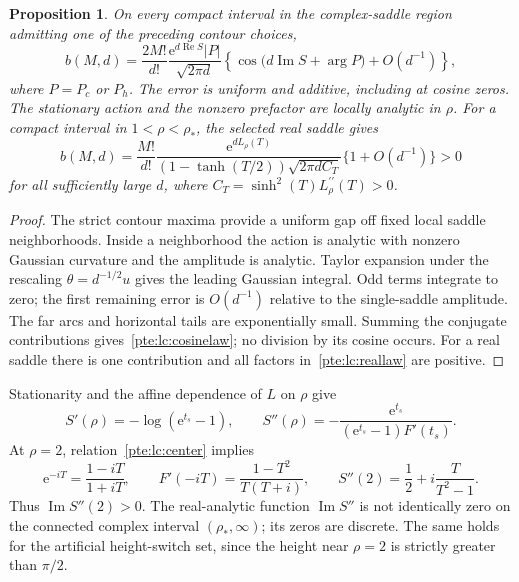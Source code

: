 \documentclass[11pt,a4paper]{article}
\numberwithin{equation}{section}
\newtheorem{proposition}[theorem]{Proposition}
\theoremstyle{definition}
\theoremstyle{plain}
\newcommand{\ee}{\mathrm e}
\begin{document}
\begin{proposition}\label{pte:lc:cosine}
On every compact interval in the complex-saddle region admitting one of the preceding contour choices,
\begin{equation}\label{pte:lc:cosinelaw}
 b(M,d)=\frac{2M!}{d!}\frac{\ee^{d\operatorname{Re}S}|P|}{\sqrt{2\pi d}}
 \left\{\cos\bigl(d\operatorname{Im}S+\arg P\bigr)+O(d^{-1})\right\},
\end{equation}
where $P=P_c$ or $P_h$. The error is uniform and additive, including at cosine zeros. The stationary action and the nonzero prefactor are locally analytic in $\rho$.
For a compact interval in $1<\rho<\rho_*$, the selected real saddle gives
\begin{equation}\label{pte:lc:reallaw}
 b(M,d)=\frac{M!}{d!}\frac{\ee^{dL_\rho(T)}}
 {(1-\tanh(T/2))\sqrt{2\pi d C_T}}
 \{1+O(d^{-1})\}>0
\end{equation}
for all sufficiently large $d$, where $C_T=\sinh^2(T)L_\rho^{\prime\prime}(T)>0$.
\end{proposition}
\begin{proof}
The strict contour maxima provide a uniform gap off fixed local saddle neighborhoods. Inside a neighborhood the action is analytic with nonzero Gaussian curvature and the amplitude is analytic. Taylor expansion under the rescaling $\theta=d^{-1/2}u$ gives the leading Gaussian integral. Odd terms integrate to zero; the first remaining error is $O(d^{-1})$ relative to the single-saddle amplitude. The far arcs and horizontal tails are exponentially small. Summing the conjugate contributions gives~\eqref{pte:lc:cosinelaw}; no division by its cosine occurs. For a real saddle there is one contribution and all factors in~\eqref{pte:lc:reallaw} are positive.
\end{proof}

Stationarity and the affine dependence of $L$ on $\rho$ give
\begin{equation}\label{pte:lc:curvature}
 S'(\rho)=-\log(\ee^{t_s}-1),\qquad
 S''(\rho)=-\frac{\ee^{t_s}}{(\ee^{t_s}-1)F'(t_s)}.
\end{equation}
At $\rho=2$, relation~\eqref{pte:lc:center} implies
\[
 \ee^{-iT}=\frac{1-iT}{1+iT},\qquad
 F'(-iT)=\frac{1-T^2}{T(T+i)},\qquad
 S''(2)=\frac12+i\frac{T}{T^2-1}.
\]
Thus $\operatorname{Im}S''(2)>0$. The real-analytic function $\operatorname{Im}S''$ is not identically zero on the connected complex interval $(\rho_*,\infty)$; its zeros are discrete. The same holds for the artificial height-switch set, since the height near $\rho=2$ is strictly greater than $\pi/2$.
\end{document}
